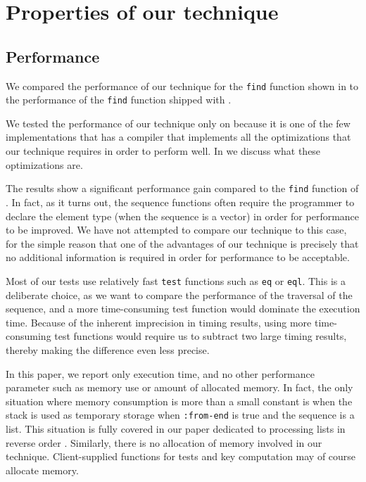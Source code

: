 \section{Properties of our technique}

\subsection{Performance}

We compared the performance of our technique for the \texttt{find}
function shown in  to the
performance of the \texttt{find} function shipped with \sbcl{}.

We tested the performance of our technique only on \sbcl{} because it
is one of the few implementations that has a compiler that implements
all the optimizations that our technique requires in order to perform
well.  In  we discuss what these optimizations
are.

The results show a significant performance gain compared to the
\texttt{find} function of \sbcl{}.  In fact, as it turns out, the
\sbcl{} sequence functions often require the programmer to declare the
element type (when the sequence is a vector) in order for performance
to be improved.  We have not attempted to compare our technique to
this case, for the simple reason that one of the advantages of our
technique is precisely that no additional information is required in
order for performance to be acceptable.

Most of our tests use relatively fast \texttt{test} functions such as
\texttt{eq} or \texttt{eql}.  This is a deliberate choice, as we
want to compare the performance of the traversal of the sequence,
and a more time-consuming test function would dominate the execution
time.  Because of the inherent imprecision in timing results, using
more time-consuming test functions would require us to subtract two
large timing results, thereby making the difference even less
precise.

In this paper, we report only execution time, and no other performance
parameter such as memory use or amount of allocated memory.  In fact,
the only situation where memory consumption is more than a small
constant is when the stack is used as temporary storage when
\texttt{:from-end} is true and the sequence is a list.  This situation
is fully covered in our paper dedicated to processing lists in reverse
order \cite{Durand:2015:ELS:reverse}.  Similarly, there is no
allocation of memory involved in our technique.  Client-supplied
functions for tests and key computation may of course allocate memory.

